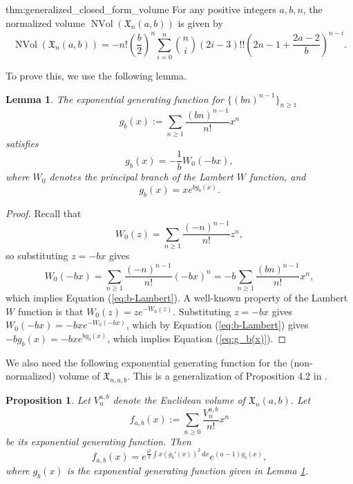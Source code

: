 \documentclass[11pt]{amsart}
\newtheorem{proposition}[theorem]{Proposition}
\newtheorem{lemma}[theorem]{Lemma}
\theoremstyle{definition}
\newcommand{\0}{\emptyset}
\DeclareMathOperator{\nVol}{NVol}
\begin{document}
\begin{reptheorem}{thm:generalized_closed_form_volume}
For any positive integers $a,b,n$, the normalized volume $\nVol(\mathfrak{X}_{n}(a,b))$ is given by
\begin{equation}
    \nVol(\mathfrak{X}_{n}(a,b)) = -n!\left(\frac{b}{2}\right)^n \sum_{i=0}^n \binom{n}{i} (2i-3)!! \left(2n-1 + \frac{2a-2}{b}\right)^{n-i}. \nonumber
\end{equation}
\end{reptheorem}

To prove this, we use the following lemma.

\begin{lemma}\label{lemma:exp-g_b}
The exponential generating function for $\{(bn)^{n-1}\}_{n \geq 1}$
\begin{equation}
    g_b(x) := \sum_{n \geq 1} \frac{(bn)^{n-1}}{n!} x^n 
\end{equation}
satisfies
\begin{equation}\label{eq:b-Lambert}
    g_b(x) = -\frac{1}{b}W_0(-bx), 
\end{equation}
where $W_0$ denotes the principal branch of the Lambert $W$ function, and 
\begin{equation}\label{eq:g_b(x)}
    g_b(x) = xe^{bg_b(x)}.
\end{equation}
\end{lemma}

\begin{proof}
Recall that 
\begin{equation}
    W_0(z) = \sum_{n \geq 1} \frac{(-n)^{n-1}}{n!} z^n, \nonumber
\end{equation}
so substituting $z=-bx$ gives
\begin{equation}\label{eq:W_0(-bx)}
    W_0(-bx) = \sum_{n \geq 1} \frac{(-n)^{n-1}}{n!} (-bx)^n =  -b\sum_{n \geq 1} \frac{(bn)^{n-1}}{n!} x^n,
\end{equation}
which implies Equation (\ref{eq:b-Lambert}). A well-known property of the Lambert $W$ function is that 
$W_0(z) = ze^{-W_0(z)}$.
Substituting $z=-bx$ gives    
$W_0(-bx) = -bxe^{-W_0(-bx)}$,
which by Equation (\ref{eq:b-Lambert}) gives
$-bg_b(x) = -bxe^{bg_b(x)}$,
which implies Equation (\ref{eq:g_b(x)}).
\end{proof}

We also need the following exponential generating function for the (non-normalized) volume of $\mathfrak{X}_{n,a,b}$. This is a generalization of Proposition 4.2 in \cite{AW}.

\begin{proposition}\label{prop:general_exp_gen}
Let $V^{a,b}_n$ denote the Euclidean volume of $\mathfrak{X}_{n}(a,b)$. Let
\begin{equation}
    f_{a,b}(x) := \sum_{n\geq 0} \frac{V^{a,b}_n}{n!}x^n
\end{equation}
be its exponential generating function. Then 
\begin{equation}
    f_{a,b}(x) = e^{\frac{b^2}{2}\int x(g_b'(x))^2 \, dx}e^{(a-1)g_b(x)},
\end{equation}
where $g_b(x)$ is the exponential generating function given in Lemma \ref{lemma:exp-g_b}.
\end{proposition}
\end{document}
